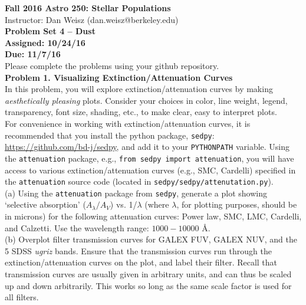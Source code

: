 \documentclass{article}
\begin{document}
\noindent \textbf{\large{Fall 2016 Astro 250: Stellar Populations}} \\
\noindent Instructor: Dan Weisz (dan.weisz@berkeley.edu) \\
\textbf{\large{Problem Set 4 -- Dust}} \\
\textbf{{Assigned: 10/24/16}} \\
\textbf{{Due: 11/7/16}} \\

Please complete the problems using your github repository. \\


\noindent \textbf{Problem 1. Visualizing Extinction/Attenuation Curves} \\ 


In this problem, you will explore extinction/attenuation curves by making \textit{aesthetically pleasing} plots.  Consider your choices in color, line weight, legend, transparency, font size, shading, etc., to make clear, easy to interpret plots. \\

For convenience in working with extinction/attenuation curves, it is recommended that you install the  python package, \texttt{sedpy}: \url{https://github.com/bd-j/sedpy}, and add it to your \texttt{PYTHONPATH} variable.  Using the \texttt{attenuation} package, e.g., \texttt{from sedpy import attenuation}, you will have access to various extinction/attenuation curves (e.g., SMC, Cardelli) specified in the \texttt{attenuation} source code (located in \texttt{sedpy/sedpy/attenutation.py}). \\

(a) Using the \texttt{attenuation} package from \texttt{sedpy}, generate a plot showing `selective absorption' ($A_\lambda / A_V$) vs. 1/$\lambda$ (where $\lambda$, for plotting purposes, should be in microns) for the following attenuation curves: Power law, SMC, LMC, Cardelli, and Calzetti.  Use the wavelength range: $1000-10000$ \AA. \\

(b) Overplot filter transmission curves for GALEX FUV, GALEX NUV, and the 5 SDSS \textit{ugriz} bands.  Ensure that the transmission curves run through the extinction/attenuation curves on the plot, and label their filter.  Recall that transmission curves are usually given in arbitrary units, and can thus be scaled up and down arbitrarily.  This works so long as the same scale factor is used for all filters. \\
\end{document}

